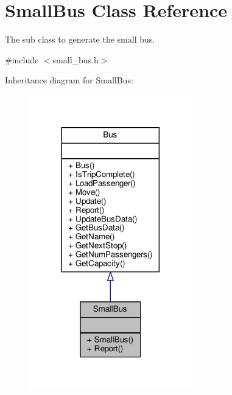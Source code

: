 \hypertarget{classSmallBus}{}\section{Small\+Bus Class Reference}
\label{classSmallBus}


The sub class to generate the small bus.  




{\ttfamily \#include $<$small\+\_\+bus.\+h$>$}



Inheritance diagram for Small\+Bus\+:\nopagebreak
\begin{figure}[H]
\begin{center}
\leavevmode
\includegraphics[width=200pt]{classSmallBus__inherit__graph}
\end{center}
\end{figure}


